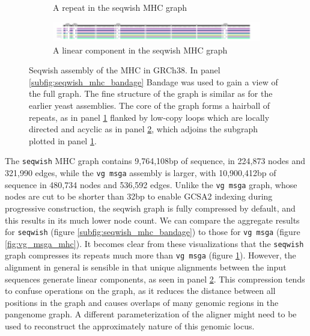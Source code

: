 \begin{figure}[htbp!]
\begin{subfigure}[t]{0.49\textwidth}
    \caption{A repeat in the seqwish MHC graph}
    \label{subfig:seqwish_mhc_neato}
  \end{subfigure}
  \begin{subfigure}[t]{0.9\textwidth}
    \includegraphics[width=1.0\textwidth]{Chapter3/Figs/seqwish_MHC_n492324_viz.pdf}
    \caption{A linear component in the seqwish MHC graph}
    \label{subfig:seqwish_mhc_viz}
  \end{subfigure}
  \caption[Seqwish assembly of the MHC in GRCh38.]{
    Seqwish assembly of the MHC in GRCh38.
    In panel \ref{subfig:seqwish_mhc_bandage} Bandage was used to gain a view of the full graph.
    The fine structure of the graph is similar as for the earlier yeast assemblies.
    The core of the graph forms a hairball of repeats, as in panel \ref{subfig:seqwish_mhc_neato} flanked by low-copy loops which are locally directed and acyclic as in panel \ref{subfig:seqwish_mhc_viz}, which adjoins the subgraph plotted in panel \ref{subfig:seqwish_mhc_neato}.
  }
  \label{fig:seqwish_mhc}
\end{figure}

The {\tt seqwish} MHC graph contains 9,764,108bp of sequence, in 224,873 nodes and 321,990 edges, while the {\tt vg msga} assembly is larger, with 10,900,412bp of sequence in 480,734 nodes and 536,592 edges.
Unlike the {\tt vg msga} graph, whose nodes are cut to be shorter than 32bp to enable GCSA2 indexing during progressive construction, the seqwish graph is fully compressed by default, and this results in its much lower node count.
We can compare the aggregate results for {\tt seqwish} (figure \ref{subfig:seqwish_mhc_bandage}) to those for {\tt vg msga} (figure \ref{fig:vg_msga_mhc}).
It becomes clear from these visualizations that the {\tt seqwish} graph compresses its repeats much more than {\tt vg msga} (figure \ref{subfig:seqwish_mhc_neato}).
However, the alignment in general is sensible in that unique alignments between the input sequences generate linear components, as seen in panel \ref{subfig:seqwish_mhc_viz}.
This compression tends to confuse operations on the graph, as it reduces the distance between all positions in the graph and causes overlaps of many genomic regions in the pangenome graph.
A different parameterization of the aligner might need to be used to reconstruct the approximately nature of this genomic locus.

